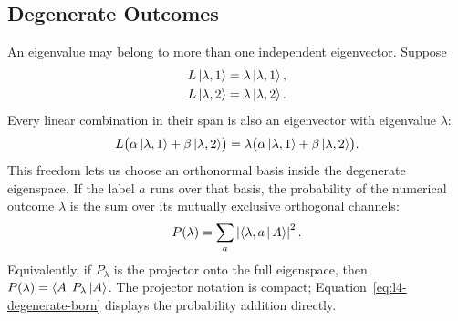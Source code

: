 \begin{classroomqa}
\end{classroomqa}

\begin{classroomqa}
\end{classroomqa}

\subsection{Degenerate Outcomes}

An eigenvalue may belong to more than one independent eigenvector. Suppose
\begin{align}
L\left\lvert\lambda,1\right\rangle&=\lambda\left\lvert\lambda,1\right\rangle,\\
L\left\lvert\lambda,2\right\rangle&=\lambda\left\lvert\lambda,2\right\rangle.
\end{align}
Every linear combination in their span is also an eigenvector with eigenvalue \(\lambda\):
\begin{equation}
L\bigl(\alpha\left\lvert\lambda,1\right\rangle+\beta\left\lvert\lambda,2\right\rangle\bigr)
=
\lambda\bigl(\alpha\left\lvert\lambda,1\right\rangle+\beta\left\lvert\lambda,2\right\rangle\bigr).
\end{equation}
This freedom lets us choose an orthonormal basis inside the degenerate eigenspace. If the label \(a\) runs over that basis, the probability of the numerical outcome \(\lambda\) is the sum over its mutually exclusive orthogonal channels:
\begin{equation}
P(\lambda)=\sum_a\left|\left\langle\lambda,a\,\middle|\,A\right\rangle\right|^2.
\label{eq:l4-degenerate-born}
\end{equation}
Equivalently, if \(P_\lambda\) is the projector onto the full eigenspace, then \(P(\lambda)=\left\langle A\right\rvert P_\lambda\left\lvert A\right\rangle\). The projector notation is compact; Equation~\eqref{eq:l4-degenerate-born} displays the probability addition directly.


